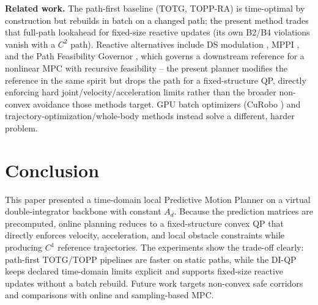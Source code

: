 \textbf{Related work.} The path-first baseline (TOTG, TOPP-RA) is
time-optimal by construction but rebuilds in batch on a changed path; the
present method trades that full-path lookahead for fixed-size reactive
updates (its own B2/B4 violations vanish with a \(C^2\) path). Reactive
alternatives include DS modulation \cite{khansari2012,koptev2024}, MPPI
\cite{williams2017}, and the Path Feasibility Governor \cite{pathfg}, which
governs a downstream reference for a nonlinear MPC with recursive
feasibility -- the present planner modifies the reference in the same
spirit but drops the path for a fixed-structure QP, directly enforcing hard
joint/velocity/acceleration limits rather than the broader non-convex
avoidance those methods target. GPU batch optimizers (CuRobo
\cite{curobo2023}) and trajectory-optimization/whole-body methods
\cite{sleiman2021} instead solve a different, harder problem.



\section{Conclusion}\label{ix.-conclusion}

This paper presented a time-domain local Predictive Motion Planner on a
virtual double-integrator backbone with constant \(A_d\). Because the
prediction matrices are precomputed, online planning reduces to a
fixed-structure convex QP that directly enforces velocity, acceleration,
and local obstacle constraints while producing \(C^1\) reference
trajectories. The experiments show the trade-off clearly: path-first
TOTG/TOPP pipelines are faster on static paths, while the DI-QP keeps
declared time-domain limits explicit and supports fixed-size reactive
updates without a batch rebuild. Future work targets non-convex safe
corridors and comparisons with online and sampling-based MPC.
